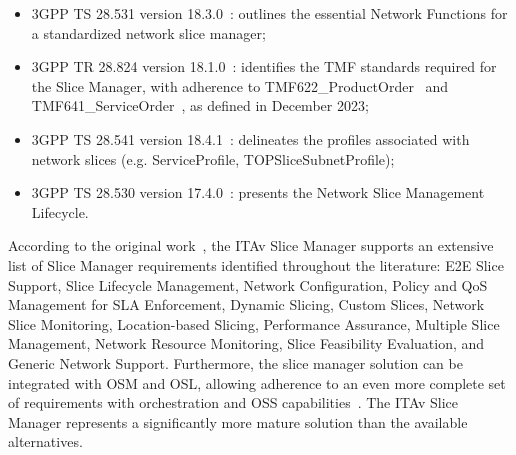 \begin{itemize}
    \item 3GPP TS 28.531 version 18.3.0~\cite{ITAv_3gpp_28531_v18_3_0}: outlines the essential Network Functions for a standardized network slice manager;
    
    \item 3GPP TR 28.824 version 18.1.0~\cite{ITAv_3gpp_28824_v18_0_1}: identifies the \acf{TMF} standards required for the Slice Manager, with adherence to TMF622\_ProductOrder~\cite{TMF622UserGuideV5} and TMF641\_ServiceOrder~\cite{TMF641UserGuideV411}, as defined in December 2023;

    \item 3GPP TS 28.541 version 18.4.1~\cite{ITAv_3gpp_28541_v18_4_1}: delineates the profiles associated with network slices (e.g. ServiceProfile, TOPSliceSubnetProfile);

    \item 3GPP TS 28.530 version 17.4.0~\cite{ITAv_3gpp_28530_v17_4_0}: presents the Network Slice Management Lifecycle.
\end{itemize}

According to the original work~\cite{ITAvSliceManager}, the \acs{ITAv} Slice Manager supports an extensive list of Slice Manager requirements identified throughout the literature: \ac{E2E} Slice Support, Slice Lifecycle Management, Network Configuration, Policy and \acs{QoS} Management for \acs{SLA} Enforcement, Dynamic Slicing, Custom Slices, Network Slice Monitoring, Location-based Slicing, Performance Assurance, Multiple Slice Management, Network Resource Monitoring, Slice Feasibility Evaluation, and Generic Network Support. Furthermore, the slice manager solution can be integrated with \acs{OSM} and \acf{OSL}, allowing adherence to an even more complete set of requirements with orchestration and \acf{OSS} capabilities~\cite{ITAvSliceManager}. The \acs{ITAv} Slice Manager represents a significantly more mature solution than the available alternatives.



